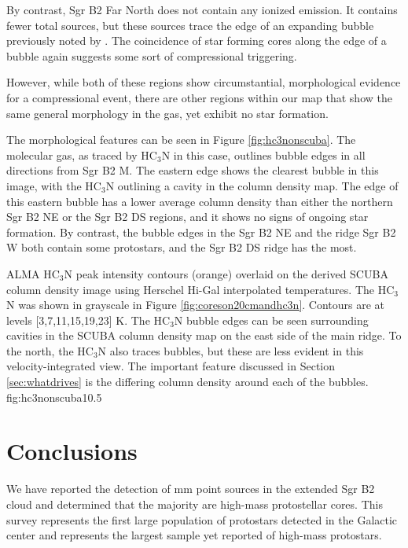 \documentclass[twocolumn]{aastex61}
\begin{document}
By contrast, Sgr B2 Far North does not contain any ionized emission.  It
contains fewer total sources, but these sources trace the edge of an expanding
bubble previously noted by \citet{de-Vicente1997a}.  The coincidence of star
forming cores along the edge of a bubble again suggests some sort of
compressional triggering.

However, while both of these regions show circumstantial, morphological evidence
for a compressional event, there are other regions within our map that show
the same general morphology in the gas, yet exhibit no star formation.

The morphological features can be seen in Figure \ref{fig:hc3nonscuba}.  The
molecular gas, as traced by HC$_3$N in this case, outlines bubble edges in all
directions from Sgr B2 M.  The eastern edge shows the clearest bubble in this
image, with the HC$_3$N outlining a cavity in the column density map.  The edge
of this eastern bubble has a lower average column density than either the
northern Sgr B2 NE or the Sgr B2 DS regions, and it shows no signs of ongoing
star formation.  By contrast, the bubble edges in the Sgr B2 NE and the ridge
Sgr B2 W both contain some protostars, and the Sgr B2 DS ridge has the most.

{ALMA HC$_3$N peak intensity contours (orange) overlaid on the derived SCUBA column density
image using Herschel Hi-Gal interpolated temperatures. The HC$_3$N was
shown in grayscale in Figure \ref{fig:coreson20cmandhc3n}.
Contours are at levels [3,7,11,15,19,23] K.  The  HC$_3$N bubble edges can be
seen surrounding cavities in the SCUBA column density map on the east side of
the main ridge.  To the north, the HC$_3$N also traces bubbles, but these are
less evident in this velocity-integrated view.  The important feature discussed
in Section \ref{sec:whatdrives} is the differing column density around each of
the bubbles.}
{fig:hc3nonscuba}{1}{0.5\textwidth}

\section{Conclusions}
We have reported the detection of  mm point sources in the extended
Sgr B2 cloud and determined that the majority are high-mass protostellar
cores.  This survey represents the first large population of protostars
detected in the Galactic center and represents the largest sample yet reported
of high-mass protostars.
\end{document}
